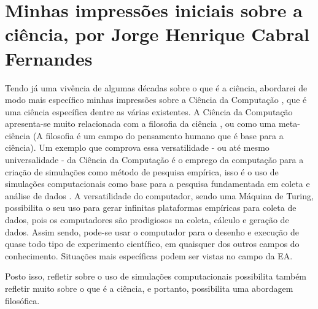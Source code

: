 \section{Minhas impressões iniciais sobre a ciência, por Jorge Henrique Cabral Fernandes}


Tendo já uma vivência de algumas décadas sobre o que é a ciência, abordarei de modo mais específico minhas impressões sobre a Ciência da Computação \citep{baldwin_three-fold_1994}, que é uma ciência específica dentre as várias existentes. A Ciência da Computação apresenta-se muito relacionada com a filosofia da ciência \citep{floridi_blackwell_2004}, ou como uma meta-ciência (A filosofia é um campo do pensamento humano que é base para a ciência). Um exemplo que comprova essa versatilidade - ou até mesmo universalidade - da Ciência da Computação é o emprego da computação para a criação de simulações como método de pesquisa empírica, isso é o uso de simulações computacionais como base para a pesquisa fundamentada em coleta e análise de dados \citep{tedre_experiments_2014}. A versatilidade do computador, sendo uma Máquina de Turing, possibilita o seu uso para gerar infinitas plataformas empíricas para coleta de dados, pois os computadores são prodigiosos na coleta, cálculo e geração de dados. Assim sendo, pode-se usar o computador para o desenho e execução de quase todo tipo de experimento científico, em quaisquer dos outros campos do conhecimento. Situações mais específicas podem ser vistas no campo da \gls{EA}.

Posto isso, refletir sobre o uso de simulações computacionais possibilita também refletir muito sobre o que é a ciência, e portanto, possibilita uma abordagem filosófica.
